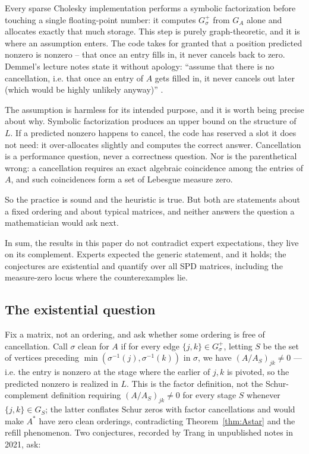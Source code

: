 \documentclass[11pt]{article}
\theoremstyle{plain}
\theoremstyle{definition}
\begin{document}
\begin{humanblock}
Every sparse Cholesky implementation performs a symbolic factorization before touching a single floating-point number: it computes $G^+_\sigma$ from $G_A$ alone and allocates exactly that much storage. This step is purely graph-theoretic, and it is where an assumption enters. The code takes for granted that a position predicted nonzero is nonzero -- that once an entry fills in, it never cancels back to zero. Demmel's lecture notes state it without apology: ``assume that there is no cancellation, i.e. that once an entry of $A$ gets filled in, it never cancels out later (which would be highly unlikely anyway)'' \cite{Demmel}.

The assumption is harmless for its intended purpose, and it is worth being precise about why. Symbolic factorization produces an upper bound on the structure of $L$. If a predicted nonzero happens to cancel, the code has reserved a slot it does not need: it over-allocates slightly and computes the correct answer. Cancellation is a performance question, never a correctness question. Nor is the parenthetical wrong: a cancellation requires an exact algebraic coincidence among the entries of $A$, and such coincidences form a set of Lebesgue measure zero.

So the practice is sound and the heuristic is true. But both are statements about a fixed ordering and about typical matrices, and neither answers the question a mathematician would ask next.

In sum, the results in this paper do not contradict expert expectations, they live on its complement. Experts expected the generic statement, and it holds; the conjectures are existential and quantify over all SPD matrices, including the measure-zero locus where the counterexamples lie. 

\subsection{The existential question}\label{sec:intro-exist}

Fix a matrix, not an ordering, and ask whether some ordering is free of cancellation. Call $\sigma$ clean for $A$ if for every edge $\{j,k\}\in G^+_\sigma$, letting $S$ be the set of vertices preceding $\min(\sigma^{-1}(j),\sigma^{-1}(k))$ in $\sigma$, we have $(A/A_S)_{jk}\neq0$ — i.e. the entry is nonzero at the stage where the earlier of $j,k$ is pivoted, so the predicted nonzero is realized in $L$. This is the factor definition, not the Schur-complement definition requiring $(A/A_S)_{jk}\neq0$ for every stage $S$ whenever $\{j,k\}\in G_S$; the latter conflates Schur zeros with factor cancellations and would make $A^*$ have zero clean orderings, contradicting Theorem~\ref{thm:Astar} and the refill phenomenon. Two conjectures, recorded by Trang in unpublished notes in 2021, ask:
\newline


\end{humanblock}
\end{document}
